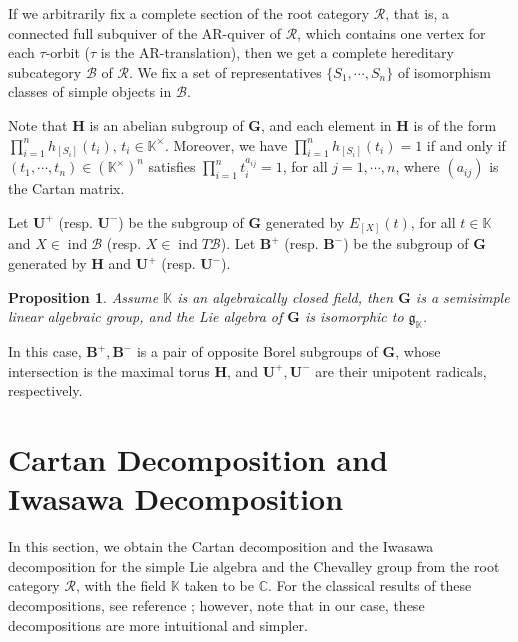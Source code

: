 \documentclass[12pt]{amsart}
\newtheorem{proposition}[theorem]{Proposition}
\begin{document}
If we arbitrarily fix a complete section of the root category $\mathcal{R}$, that is, a connected full subquiver of the AR-quiver of $\mathcal{R}$, which contains one vertex for each $\tau$-orbit ($\tau$ is the AR-translation), then we get a complete hereditary subcategory $\mathcal{B}$ of $\mathcal{R}$.
We fix a set of representatives $\{S_1,\cdots,S_n\}$ of isomorphism classes of simple objects in $\mathcal{B}$.

Note that $\mathbf{H}$ is an abelian subgroup of $\mathbf{G}$, and each element in $\mathbf{H}$ is of the form $\prod\limits_{i=1}^n h_{[S_i]}(t_i)$, $t_i\in \mathbb{K}^{\times}$.
Moreover, we have 
 $ \prod\limits_{i=1}^n h_{[S_i]}(t_i) =1$ if and only if 
       $ (t_1,\cdots,t_n) \in (\mathbb{K}^{\times})^n$ satisfies $\prod\limits_{i=1}^n t_i^{a_{ij}} = 1$, for all $ j=1,\cdots,n$,
    where $(a_{ij})$ is the Cartan matrix.

Let $\mathbf{U}^+$ (resp. $\mathbf{U}^-$) be the subgroup of $\mathbf{G}$ generated by $E_{[X]}(t)$, for all $t\in \mathbb{K}$ and $X\in \operatorname{ind}\mathcal{B}$ (resp. $X\in \operatorname{ind}T\mathcal{B}$).
Let $\mathbf{B}^+$ (resp. $\mathbf{B}^-$) be the subgroup of $\mathbf{G}$ generated by $\mathbf{H}$ and $\mathbf{U}^+$ (resp. $\mathbf{U}^-$).

\begin{proposition}
    \cite[Cor 4.42,4.44]{notes1}
    Assume $\mathbb{K}$ is an algebraically closed field, then $\mathbf{G}$ is a semisimple linear algebraic group, and the Lie algebra of $\mathbf{G}$ is isomorphic to $\mathfrak{g}_{\mathbb{K}}$.
\end{proposition}
In this case, $\mathbf{B}^+,\mathbf{B}^-$ is a pair of opposite Borel subgroups of $\mathbf{G}$, whose intersection is the maximal torus $\mathbf{H}$, and $\mathbf{U}^+,\mathbf{U}^-$ are their unipotent radicals, respectively.



\section{Cartan Decomposition and Iwasawa Decomposition}
In this section, we obtain the Cartan decomposition and the Iwasawa decomposition for the simple Lie algebra and the Chevalley group from the root category $\mathcal{R}$, with the field $\mathbb{K}$ taken to be $\mathbb{C}$.
For the classical results of these decompositions, see reference \cite{Knapp}; however, note that in our case, these decompositions are more intuitional and simpler.
\end{document}
